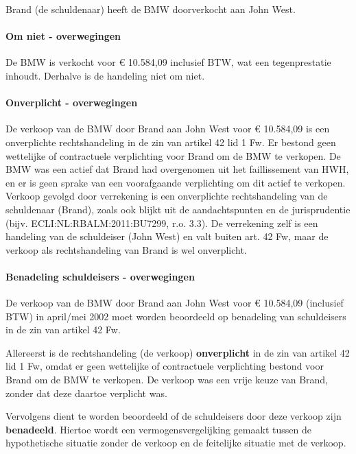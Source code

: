 \documentclass[
  dutch,
  a4paper,
]{article}
\begin{document}
Brand (de schuldenaar) heeft de BMW doorverkocht aan John West.

\paragraph{Om niet - overwegingen}\label{om-niet---overwegingen-57}

De BMW is verkocht voor € 10.584,09 inclusief BTW, wat een tegenprestatie inhoudt. Derhalve is de handeling niet om niet.

\paragraph{Onverplicht - overwegingen}\label{onverplicht---overwegingen-57}

De verkoop van de BMW door Brand aan John West voor € 10.584,09 is een onverplichte rechtshandeling in de zin van artikel 42 lid 1 Fw. Er bestond geen wettelijke of contractuele verplichting voor Brand om de BMW te verkopen. De BMW was een actief dat Brand had overgenomen uit het faillissement van HWH, en er is geen sprake van een voorafgaande verplichting om dit actief te verkopen. Verkoop gevolgd door verrekening is een onverplichte rechtshandeling van de schuldenaar (Brand), zoals ook blijkt uit de aandachtspunten en de jurisprudentie (bijv. ECLI:NL:RBALM:2011:BU7299, r.o. 3.3). De verrekening zelf is een handeling van de schuldeiser (John West) en valt buiten art. 42 Fw, maar de verkoop als rechtshandeling van Brand is wel onverplicht.

\paragraph{Benadeling schuldeisers - overwegingen}\label{benadeling-schuldeisers---overwegingen-57}

De verkoop van de BMW door Brand aan John West voor € 10.584,09 (inclusief BTW) in april/mei 2002 moet worden beoordeeld op benadeling van schuldeisers in de zin van artikel 42 Fw.

Allereerst is de rechtshandeling (de verkoop) \textbf{onverplicht} in de zin van artikel 42 lid 1 Fw, omdat er geen wettelijke of contractuele verplichting bestond voor Brand om de BMW te verkopen. De verkoop was een vrije keuze van Brand, zonder dat deze daartoe verplicht was.

Vervolgens dient te worden beoordeeld of de schuldeisers door deze verkoop zijn \textbf{benadeeld}. Hiertoe wordt een vermogensvergelijking gemaakt tussen de hypothetische situatie zonder de verkoop en de feitelijke situatie met de verkoop.
\end{document}
